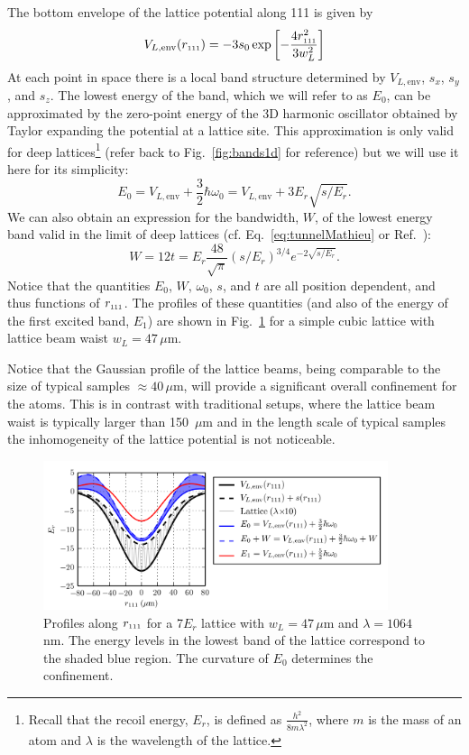 The bottom envelope of the lattice potential along 111 is given by 
\begin{equation}
  V_{L,\text{env}}(  r_{\text{\tiny{111}}}  )  = -3 s_{0} 
  \exp \left[ - \frac{ 4  r_{\text{\tiny{111}}} ^{2} }{3 w_{L}^{2} } \right]  
\end{equation}
At each point in space there is a local band structure determined by
$V_{L,\text{env}}$, $s_{x}$, $s_{y}$, and $s_{z}$.  The lowest energy of the
band, which we will refer to  as $E_{0}$, can be approximated by the zero-point
energy of the 3D harmonic oscillator obtained by Taylor expanding the potential
at a lattice site.   This approximation is only valid for deep
lattices\footnote{Recall that the recoil energy, $E_{r}$, is defined as
$\frac{h^{2}}{8m\lambda^{2}}$, where $m$ is the mass of an atom and $\lambda$
is the wavelength of the lattice. } (refer back to 
Fig.~\ref{fig:bands1d} for reference) but we will use it here for its simplicity: 
\begin{equation} E_{0} =  V_{L,\text{env}} +  
     \frac{3}{2} \hbar \omega_{0}  = V_{L,\text{env}} +  3E_{r}\sqrt{ s/E_{r} }. 
\end{equation} 
We can also obtain an expression for the bandwidth, $W$, of the lowest energy
band valid in the limit of deep lattices (cf. Eq.~\ref{eq:tunnelMathieu} or
Ref.~\cite{Bloch2008}):
\begin{equation}
  W =   12 t 
  = E_{r}\frac{48}{\sqrt{\pi}} (s/E_{r})^{3/4} e^{-2\sqrt{s/E_{r}}} .
\end{equation}
Notice that the quantities $E_{0}$, $W$, $\omega_{0}$, $s$, and $t$ are all
position dependent, and thus functions of $ r_{\text{\tiny{111}}} $. The profiles of these
quantities (and also of the energy of the first excited band, $E_{1}$) are
shown in Fig.~\ref{fig:lattice_general} for a simple cubic lattice  with
lattice beam waist $w_{L}=47\,\mu$m.  

Notice that the Gaussian profile of the lattice beams, being comparable to the
size of typical samples $\approx 40\,\mu$m,  will provide a significant overall
confinement for the atoms. This is in contrast with traditional setups, where
the lattice beam waist is typically larger than 150~$\mu$m and in the length
scale of typical samples the inhomogeneity of the lattice potential is not
noticeable. 
\begin{figure}
    \centering
\includegraphics[width=0.9\textwidth]{../figures/lda_evap/lattice_general.png}
\caption{\small Profiles along $ r_{\text{\tiny{111}}} $ for a 7$E_{r}$ lattice with
$w_{L}=47\,\mu$m and $\lambda=1064$\,nm.  The energy levels in the lowest band
of the lattice correspond to the shaded blue region.  The curvature of $E_{0}$
determines the confinement.  }
\label{fig:lattice_general}
\end{figure}


